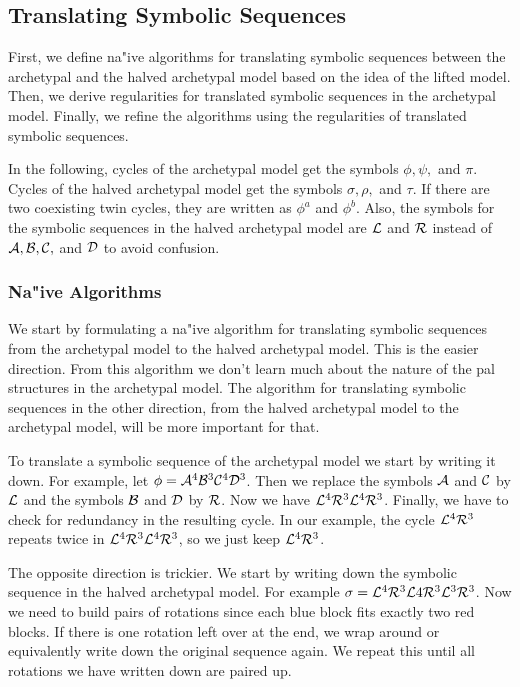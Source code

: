 \subsection{Translating Symbolic Sequences}
\label{sec:add.halved.tanslating}

First, we define na"ive algorithms for translating symbolic sequences between the archetypal and the halved archetypal model based on the idea of the lifted model.
Then, we derive regularities for translated symbolic sequences in the archetypal model.
Finally, we refine the algorithms using the regularities of translated symbolic sequences.

In the following, cycles of the archetypal model get the symbols $\phi, \psi,$ and $\pi$.
Cycles of the halved archetypal model get the symbols $\sigma, \rho,$ and $\tau$.
If there are two coexisting twin cycles, they are written as $\phi^a$ and $\phi^b$.
Also, the symbols for the symbolic sequences in the halved archetypal model are $\mathcal{L}$ and $\mathcal{R}$ instead of $\mathcal{A}, \mathcal{B}, \mathcal{C},$ and $\mathcal{D}$ to avoid confusion.

\subsubsection{Na"ive Algorithms}

We start by formulating a na"ive algorithm for translating symbolic sequences from the archetypal model to the halved archetypal model.
This is the easier direction.
From this algorithm we don't learn much about the nature of the \gls{pal} structures in the archetypal model.
The algorithm for translating symbolic sequences in the other direction, from the halved archetypal model to the archetypal model, will be more important for that.

To translate a symbolic sequence of the archetypal model we start by writing it down.
For example, let $\phi = \mathcal{A}^4\mathcal{B}^3\mathcal{C}^4\mathcal{D}^3$.
Then we replace the symbols $\mathcal{A}$ and $\mathcal{C}$ by $\mathcal{L}$ and the symbols $\mathcal{B}$ and $\mathcal{D}$ by $\mathcal{R}$.
Now we have $\mathcal{L}^4\mathcal{R}^3\mathcal{L}^4\mathcal{R}^3$.
Finally, we have to check for redundancy in the resulting cycle.
In our example, the cycle $\mathcal{L}^4\mathcal{R}^3$ repeats twice in $\mathcal{L}^4\mathcal{R}^3\mathcal{L}^4\mathcal{R}^3$, so we just keep $\mathcal{L}^4\mathcal{R}^3$.

The opposite direction is trickier.
We start by writing down the symbolic sequence in the halved archetypal model.
For example $\sigma = \mathcal{L}^4\mathcal{R}^3\mathcal{L}4\mathcal{R}^3\mathcal{L}^3\mathcal{R}^3$.
Now we need to build pairs of rotations since each blue block fits exactly two red blocks.
If there is one rotation left over at the end, we wrap around or equivalently write down the original sequence again.
We repeat this until all rotations we have written down are paired up.

